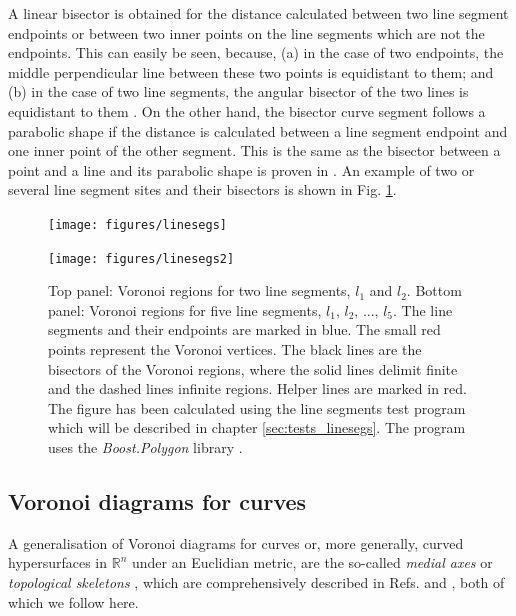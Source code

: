 A linear bisector is obtained for the distance calculated between two line segment endpoints or between two inner 
points on the line segments which are not the endpoints.
This can easily be seen, because, (a) in the case of two endpoints, the middle perpendicular line between these 
two points is equidistant to them; and (b) in the case of two line segments, the angular bisector of the two lines is
equidistant to them \cite[pp. 243-244]{FUH_geo2020}.
On the other hand, the bisector curve segment follows a parabolic shape if the distance is calculated 
between a line segment endpoint and one inner point of the other segment. This is the same as the bisector between
a point and a line and its parabolic shape is proven in \cite[pp. 260-261]{FUH_geo2020}.
An example of two or several line segment sites and their bisectors is shown in Fig. \ref{fig:linesegs_voro}.

\begin{figure}[htb]
	\begin{minipage}{1 \textwidth}
		\begin{center}
			\texttt{[image: figures/linesegs]}
		\end{center}
		\vspace{0.5cm}
	\end{minipage}
	\begin{minipage}{1 \textwidth}
		\vspace{0.25cm}
		\begin{center}
			\texttt{[image: figures/linesegs2]}
		\end{center}
	\end{minipage}
	\caption[Voronoi diagrams for line segments.]{
		Top panel: Voronoi regions for two line segments, $l_1$ and $l_2$.
		Bottom panel: Voronoi regions for five line segments, $l_1,\, l_2,\, ...,\, l_5$.
		The line segments and their endpoints are marked in blue. The small red points represent the Voronoi vertices.
		The black lines are the bisectors of the Voronoi regions, where the solid lines delimit finite and the dashed lines
		infinite regions. Helper lines are marked in red. The figure has been calculated using the line segments
		test program which will be described in chapter \ref{sec:tests_linesegs}. The program uses 
		the \textit{Boost.Polygon} library \cite{web_boost_polygon_voronoi}.
		\label{fig:linesegs_voro}}
\end{figure}




\subsection{Voronoi diagrams for curves}
\label{sec:voro_median}
A generalisation of Voronoi diagrams for curves or, more generally, curved hypersurfaces in $\mathbb{R}^n$ under 
an Euclidian metric, are the so-called \textit{medial axes} or \textit{topological skeletons} 
\cite{wiki_medial, wiki_medial2, wiki_skeleton}, which are comprehensively described in 
Refs. \cite[pp. 109-114]{Boissonnat2006} and \cite[pp. 244-252]{Cazals2006}, both of which we follow here.




